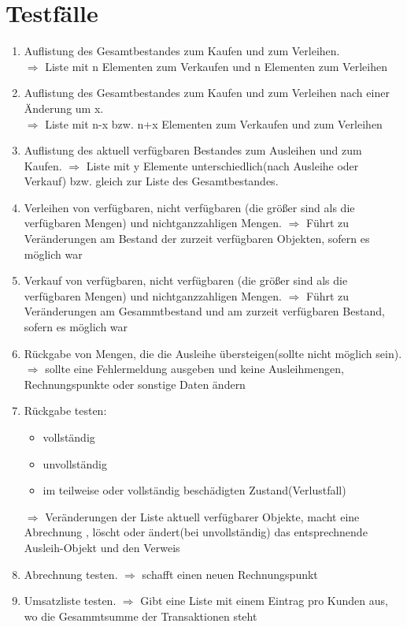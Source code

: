 \documentclass[a4paper,12pt,titlepage]{article}
\begin{document}
\part{Testfälle}
\begin{enumerate}
\item
Auflistung des Gesamtbestandes zum Kaufen und zum Verleihen.\\
$\Rightarrow$ Liste mit n Elementen zum Verkaufen und n Elementen zum Verleihen
\item
Auflistung des Gesamtbestandes zum Kaufen und zum Verleihen nach einer Änderung um x.\\
$\Rightarrow$ Liste mit n-x bzw. n+x Elementen zum Verkaufen und zum Verleihen
\item
Auflistung des aktuell verfügbaren Bestandes zum Ausleihen und zum Kaufen.
$\Rightarrow$ Liste mit y Elemente unterschiedlich(nach Ausleihe oder Verkauf) bzw. gleich zur Liste des Gesamtbestandes. 
\item
Verleihen von verfügbaren, nicht verfügbaren (die größer sind als die verfügbaren Mengen) und nichtganzzahligen Mengen.
$\Rightarrow$ Führt zu Veränderungen am Bestand der zurzeit verfügbaren Objekten, sofern es möglich war 
\item
Verkauf von verfügbaren, nicht verfügbaren (die größer sind als die verfügbaren Mengen) und nichtganzzahligen Mengen.
$\Rightarrow$ Führt zu Veränderungen am Gesammtbestand und am zurzeit verfügbaren Bestand, sofern es möglich war
\item
Rückgabe von Mengen, die die Ausleihe übersteigen(sollte nicht möglich sein).
$\Rightarrow$ sollte eine Fehlermeldung ausgeben und keine Ausleihmengen, Rechnungspunkte oder sonstige Daten ändern
\item
Rückgabe testen:
\begin{itemize}
\item vollständig
\item unvollständig 
\item im teilweise oder vollständig beschädigten Zustand(Verlustfall)
\end{itemize}
$\Rightarrow$ Veränderungen der Liste aktuell verfügbarer Objekte, macht eine Abrechnung , löscht oder ändert(bei unvollständig) das entsprechnende Ausleih-Objekt und den Verweis
\item
Abrechnung testen.
$\Rightarrow$ schafft einen neuen Rechnungspunkt
\item
Umsatzliste testen.
$\Rightarrow$ Gibt eine Liste mit einem Eintrag pro Kunden aus, wo die Gesammtsumme der Transaktionen steht

\end{enumerate}
\end{document}
